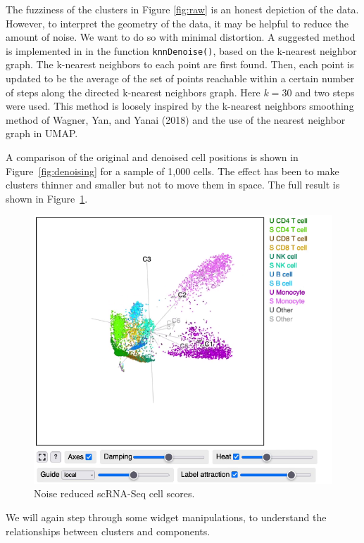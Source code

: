 The fuzziness of the clusters in Figure \ref{fig:raw} is an honest depiction of the data. However, to interpret the geometry of the data, it may be helpful to reduce the amount of noise. We want to do so with minimal distortion. A suggested method is implemented in  in the function \texttt{knnDenoise()}, based on the k-nearest neighbor graph. The k-nearest neighbors to each point are first found. Then, each point is updated to be the average of the set of points reachable within a certain number of steps along the directed k-nearest neighbors graph. Here \(k=30\) and two steps were used. This method is loosely inspired by the k-nearest neighbors smoothing method of Wagner, Yan, and Yanai (2018) and the use of the nearest neighbor graph in UMAP.

A comparison of the original and denoised cell positions is shown in Figure~\ref{fig:denoising} for a sample of 1,000 cells. The effect has been to make clusters thinner and smaller but not to move them in space. The full result is shown in Figure~\ref{fig:denoised}.

\begin{figure}
\centering
\includegraphics{langevitour-article_files/figure-latex/denoised-1.pdf}
\caption{\label{fig:denoised}Noise reduced scRNA-Seq cell scores.}
\end{figure}

We will again step through some widget manipulations, to understand the relationships between clusters and components.

